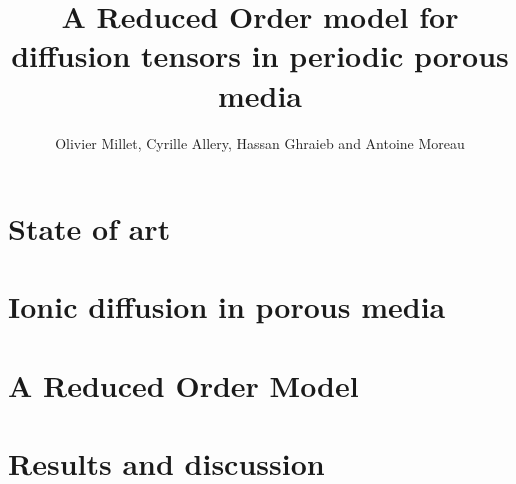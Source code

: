 \documentclass[a4paper,10pt]{article}
\title{A Reduced Order model for diffusion tensors in periodic porous media}
\author{Olivier Millet, Cyrille Allery, Hassan Ghraieb and Antoine Moreau}
\begin{document}

\maketitle

\begin{abstract}

\end{abstract}

\section{State of art}


\section{Ionic diffusion in porous media}


\section{A Reduced Order Model}


%

\section{Results and discussion}



%
\end{document}
